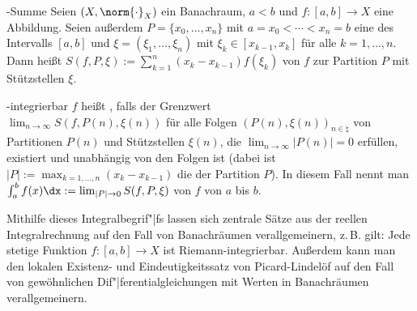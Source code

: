 \begin{Def}{-Summe}
    Seien $(X, \norm{\cdot}_X)$ ein Banachraum, $a < b$ und
    $f\colon [a, b] \rightarrow X$ eine Abbildung.
    Seien außerdem $P = \{x_0, \dotsc, x_n\}$
    mit $a = x_0 < \dotsb < x_n = b$ eine  des Intervalls $[a, b]$
    und $\xi = (\xi_1, \dotsc, \xi_n)$ 
    mit $\xi_k \in [x_{k-1}, x_k]$ für alle $k = 1, \dotsc, n$.
    Dann heißt $S(f, P, \xi) := \sum_{k=1}^n (x_k - x_{k-1}) f(\xi_k)$
     von $f$ zur Partition $P$ mit Stützstellen $\xi$.
\end{Def}

\begin{Def}{-integrierbar}
    $f$ heißt , falls der Grenzwert\\
    $\lim_{n \to \infty} S(f, P(n), \xi(n))$ für alle Folgen
    $(P(n), \xi(n))_{n \in \natural}$ von Partitionen $P(n)$ und Stützstellen $\xi(n)$,
    die $\lim_{n \to \infty} |P(n)| = 0$ erfüllen, existiert
    und unabhängig von den Folgen ist
    (dabei ist $|P| := \max_{k=1,\dotsc,n} (x_k - x_{k-1})$ die  der Partition
    $P$).
    In diesem Fall nennt man $\int_a^b f(x)\dx := \lim_{|P| \to 0} S(f, P, \xi)$
     von $f$ von $a$ bis $b$.
\end{Def}

\begin{Bem}
    Mithilfe dieses Integralbegrif"|fs lassen sich zentrale Sätze aus der reellen
    Integralrechnung auf den Fall von Banachräumen verallgemeinern, z.\,B. gilt:
    Jede stetige Funktion $f\colon [a, b] \rightarrow X$ ist Riemann-integrierbar.
    Außerdem kann man den lokalen Existenz- und Eindeutigkeitssatz von Picard-Lindelöf auf
    den Fall von gewöhnlichen Dif"|ferentialgleichungen mit Werten in Banachräumen verallgemeinern.
\end{Bem}

\pagebreak
